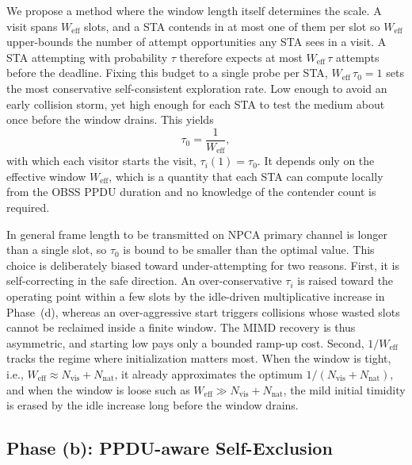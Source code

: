 \documentclass[a4paper,fleqn]{cas-dc}
\newcommand{\Nvis}{N_\mathrm{vis}}
\newcommand{\Nnat}{N_\mathrm{nat}}
\begin{document}
We propose a method where the window length itself determines the scale. A visit spans $W_\mathrm{eff}$ slots, and a STA contends in at most one of them per slot so $W_\mathrm{eff}$ upper-bounds the number of attempt opportunities any STA sees in a visit. A STA attempting with probability $\tau$ therefore expects at most $W_\mathrm{eff}\,\tau$ attempts before the deadline. Fixing this budget to a single probe per STA, $W_\mathrm{eff}\,\tau_0 = 1$ sets the most conservative self-consistent  exploration rate. Low enough to avoid an early collision storm, yet high enough for each STA to test the medium about once before the window drains. This yields
\begin{equation}
    \tau_0 = \frac{1}{W_\mathrm{eff}},
    \label{eq:init}
\end{equation}
with which each visitor starts the visit, $\tau_i(1)=\tau_0$. It depends only on the effective window $W_\mathrm{eff}$, which is a quantity that each STA can compute locally from the OBSS PPDU duration and no knowledge of the contender count is required.

In general frame length to be transmitted on NPCA primary channel is longer than a single slot, so $\tau_0 $ is bound to be smaller than the optimal value. This choice is deliberately biased toward under-attempting for two reasons. First, it is self-correcting in the safe direction. An over-conservative $\tau_i$ is raised toward the operating point within a few slots by the idle-driven multiplicative increase in Phase~(d), whereas an over-aggressive start triggers collisions whose wasted slots cannot be reclaimed inside a finite window. The MIMD recovery is thus asymmetric, and starting low pays only a bounded ramp-up cost. Second, $1/W_\mathrm{eff}$ tracks the regime where initialization matters most. When the window is tight, i.e., $W_\mathrm{eff}\!\approx\!\Nvis{+}\Nnat$, it already approximates the optimum $1/(\Nvis{+}\Nnat)$, and when the window is loose such as $W_\mathrm{eff}\!\gg\!\Nvis{+}\Nnat$, the mild initial timidity is erased by the idle increase long before the window drains. 

\subsection{Phase (b): PPDU-aware Self-Exclusion}
\label{subsec:self_exclusion}
\end{document}
